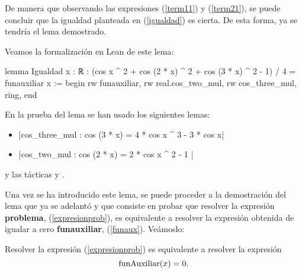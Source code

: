 \begin{demostracion}
De manera que observando las expresiones (\ref{term11}) y
(\ref{term21}), se puede concluir que la igualdad planteada en
(\ref{igualdad}) es cierta.  De esta forma, ya se tendría el lema
demostrado.
\end{demostracion}

Veamos la formalización en Lean de este lema:
\begin{leancode}
lemma Igualdad {x : ℝ} :
  (cos x ^ 2 + cos (2 * x) ^ 2 + cos (3 * x) ^ 2 - 1) / 4 = funauxiliar x :=
begin
  rw funauxiliar,
  rw real.cos_two_mul,
  rw cos_three_mul,
  ring,
end
\end{leancode}

En la prueba del lema se han usado los siguientes lemas:
\begin{itemize}
\item {}|cos_three_mul : cos (3 * x) = 4 * cos x ^ 3 - 3 * cos x|
\item {}|cos_two_mul : cos (2 * x) = 2 * cos x ^ 2 - 1 |
\end{itemize}
y las tácticas
 y
.

Una vez se ha introducido este lema, se puede proceder a la demostración
del lema que ya se adelantó y que consiste en probar que resolver la
expresión \textbf{problema}, (\ref{expresionprob}), es equivalente a
resolver la expresión obtenida de igualar a cero \textbf{funauxiliar},
(\ref{funaux}). Veámoslo:

\begin{lema}[Equivalencia]\label{lemaequivalenciaprob}
  Resolver la expresión (\ref{expresionprob}) es equivalente a resolver
  la expresión
  \begin{equation}\label{probaux}
    \mbox{\rm funAuxiliar}(x) = 0.
  \end{equation}
\end{lema}

